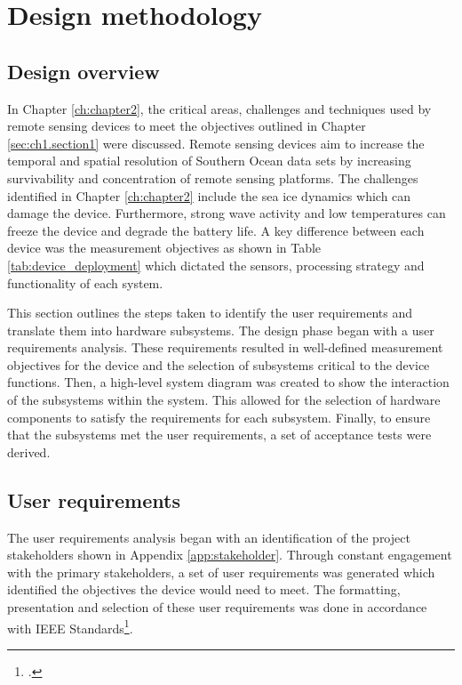 
\chapter{Design methodology}
\label{ch:ch3}
\section{Design overview}
\label{sec:ch3_design}

In Chapter \ref{ch:chapter2}, the critical areas, challenges and techniques used by remote sensing devices to meet the objectives outlined in Chapter \ref{sec:ch1.section1} were discussed. Remote sensing devices aim to increase the temporal and spatial resolution of Southern Ocean data sets by increasing survivability and concentration of remote sensing platforms. The challenges identified in Chapter \ref{ch:chapter2} include the sea ice dynamics which can damage the device. Furthermore, strong wave activity and low temperatures can freeze the device and degrade the battery life. A key difference between each device was the measurement objectives as shown in Table \ref{tab:device_deployment} which dictated the sensors, processing strategy and functionality of each system. \par

This section outlines the steps taken to identify the user requirements and translate them into hardware subsystems. The design phase began with a user requirements analysis. These requirements resulted in well-defined measurement objectives for the device and the selection of subsystems critical to the device functions. Then, a high-level system diagram was created to show the interaction of the subsystems within the system. This allowed for the selection of hardware components to satisfy the requirements for each subsystem. Finally, to ensure that the subsystems met the user requirements, a set of acceptance tests were derived. 


\section{User requirements}
\label{sec:sec3_UR}

The user requirements analysis began with an identification of the project stakeholders shown in Appendix \ref{app:stakeholder}. Through constant engagement with the primary stakeholders, a set of user requirements was generated which identified the objectives the device would need to meet. The formatting, presentation and selection of these user requirements was done in accordance with IEEE Standards\footcite{IEEE_STD_UREQ}.

